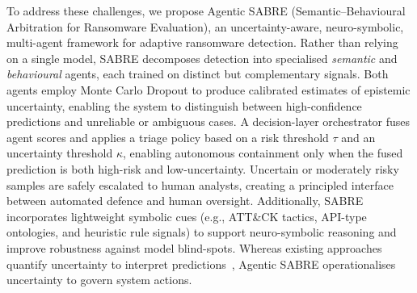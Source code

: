 \documentclass[3p]{elsarticle}
\begin{document}
To address these challenges, we propose Agentic SABRE (Semantic–Behavioural Arbitration for Ransomware Evaluation), an uncertainty-aware, neuro-symbolic, multi-agent framework for adaptive ransomware detection. Rather than relying on a single model, SABRE decomposes detection into specialised \emph{semantic} and \emph{behavioural} agents, each trained on distinct but complementary signals. Both agents employ Monte Carlo Dropout to produce calibrated estimates of epistemic uncertainty, enabling the system to distinguish between high-confidence predictions and unreliable or ambiguous cases. A decision-layer orchestrator fuses agent scores and applies a triage policy based on a risk threshold \(\tau\) and an uncertainty threshold \(\kappa\),
enabling autonomous containment only when the fused prediction is both
high-risk and low-uncertainty. Uncertain or moderately risky samples are safely escalated to human analysts, creating a principled interface between automated defence and human oversight. Additionally, SABRE incorporates lightweight symbolic cues (e.g., ATT\&CK tactics, API-type ontologies, and heuristic rule signals) to support neuro-symbolic reasoning and improve robustness against model blind-spots. Whereas existing approaches quantify uncertainty to interpret predictions~\cite{kabuye2025explainable}, Agentic SABRE operationalises uncertainty to govern system actions.
\end{document}
